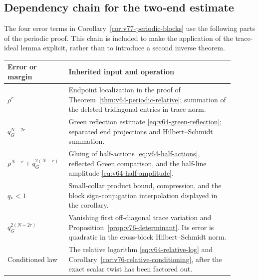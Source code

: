 \subsection{Dependency chain for the two-end estimate}
The four error terms in Corollary~\ref{cor:v77-periodic-blocks} use the
following parts of the periodic proof.  This chain is included to make
the application of the trace-ideal lemma explicit, rather than to
introduce a second inverse theorem.
\begin{center}
\small
\begin{tabular}{@{}p{0.21\linewidth}p{0.69\linewidth}@{}}
\toprule
Error or margin & Inherited input and operation\\
\midrule
$\rho^r$ & Endpoint localization in the proof of
Theorem~\ref{thm:v64-periodic-relative}; summation of the deleted
tridiagonal entries in trace norm.\\[3pt]
$q_G^{N-2r}$ & Green reflection estimate
\eqref{eq:v64-green-reflection}; separated end projections and
Hilbert--Schmidt summation.\\[3pt]
$\rho^{N-r}+q_G^{2(N-r)}$ & Gluing of half-actions
\eqref{eq:v64-half-actions}, reflected Green comparison, and the
half-line amplitude \eqref{eq:v64-half-amplitude}.\\[3pt]
$q_*<1$ & Small-collar product bound, compression, and the block
sign-conjugation interpolation displayed in the corollary.\\[3pt]
$q_G^{2(N-2r)}$ & Vanishing first off-diagonal trace variation and
Proposition~\ref{prop:v76-determinant}.  Its error is quadratic in
the cross-block Hilbert--Schmidt norm.\\[3pt]
Conditioned law & The relative logarithm
\eqref{eq:v64-relative-log} and
Corollary~\ref{cor:v76-relative-conditioning}, after the exact scalar
twist has been factored out.\\
\bottomrule
\end{tabular}
\end{center}
